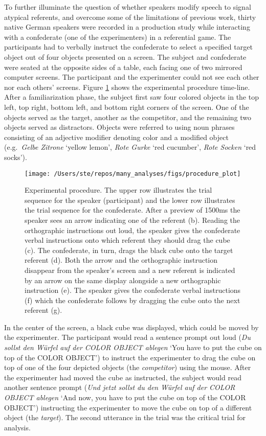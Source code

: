 \documentclass[Review,times,sageh]{sagej}
\begin{document}
To further illuminate the question of whether speakers modify speech to signal atypical referents, and overcome some of the limitations of previous work, thirty native German speakers were recorded in a production study while interacting with a confederate (one of the experimenters) in a referential game.
The participants had to verbally instruct the confederate to select a specified target object out of four objects presented on a screen.
The subject and confederate were seated at the opposite sides of a table, each facing one of two mirrored computer screens.
The participant and the experimenter could not see each other nor each others' screens.
Figure \ref{fig:procedural} shows the experimental procedure time-line.
After a familiarization phase, the subject first saw four colored objects in the top left, top right, bottom left, and bottom right corners of the screen.
One of the objects served as the target, another as the competitor, and the remaining two objects served as distractors.
Objects were referred to using noun phrases consisting of an adjective modifier denoting color and a modified object (e.g.~\emph{Gelbe Zitrone} `yellow lemon', \emph{Rote Gurke} `red cucumber', \emph{Rote Socken} `red socks').



\begin{figure}
\texttt{[image: /Users/ste/repos/many\_analyses/figs/procedure\_plot]} \caption{Experimental procedure. The upper row illustrates the trial sequence for the speaker (participant) and the lower row illustrates the trial sequence for the confederate. After a preview of 1500ms the speaker sees an arrow indicating one of the referent (b). Reading the orthographic instructions out loud, the speaker gives the confederate verbal instructions onto which referent they should drag the cube (c). The confederate, in turn, drags the black cube onto the target referent (d). Both the arrow and the orthographic instruction disappear from the speaker's screen and a new referent is indicated by an arrow on the same display alongside a new orthographic instruction (e). The speaker gives the confederate verbal instructions (f) which the confederate follows by dragging the cube onto the next referent (g).}\label{fig:procedural}
\end{figure}

In the center of the screen, a black cube was displayed, which could be moved by the experimenter.
The participant would read a sentence prompt out loud (\emph{Du sollst den Würfel auf der COLOR OBJECT ablegen} `You have to put the cube on top of the COLOR OBJECT') to instruct the experimenter to drag the cube on top of one of the four depicted objects (the \emph{competitor}) using the mouse.
After the experimenter had moved the cube as instructed, the subject would read another sentence prompt (\emph{Und jetzt sollst du den Würfel auf der COLOR OBJECT ablegen} `And now, you have to put the cube on top of the COLOR OBJECT') instructing the experimenter to move the cube on top of a different object (the \emph{target}).
The second utterance in the trial was the critical trial for analysis.
\end{document}
